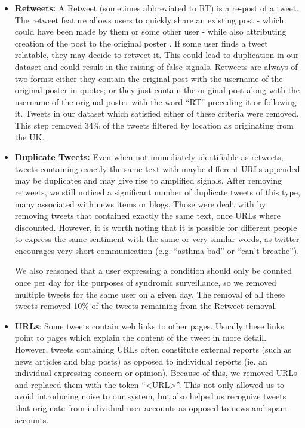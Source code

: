 \documentclass[10pt,letterpaper]{article}
\begin{document}
\begin{itemize}
  \item \textbf{Retweets:} A Retweet (sometimes abbreviated to RT) is a re-post of a tweet. The retweet feature allows users to quickly share an existing post - which could have been made by them or some other user - while also attributing creation of the post to the original poster \cite{REF10}. If some user finds a tweet relatable, they may decide to retweet it. This could lead to duplication in our dataset and could result in the raising of false signals. Retweets are always of two forms: either they contain the original post with the username of the original poster in quotes; or they just contain the original post along with the username of the original poster with the word ``RT'' preceding it or following it. Tweets in our dataset which satisfied either of these criteria were removed. This step removed 34\% of the tweets filtered by location as originating from the UK.
  
  \item \textbf{Duplicate Tweets:} Even when not immediately identifiable as retweets, tweets containing exactly the same text  with maybe different URLs appended may be duplicates and may give rise to amplified signals. After removing retweets, we still noticed a significant number of duplicate tweets of this type, many associated with news items or blogs. Those were dealt with by removing tweets that contained exactly the same text, once URLs where discounted. However, it is worth noting that it is possible for different people to express the same sentiment with the same  or very similar words, as twitter encourages very short communication (e.g.  ``asthma bad'' or  ``can't breathe''). 
  
We also reasoned that a user expressing a condition should only be counted once per day for the purposes of syndromic surveillance, so we removed multiple tweets for the same user on a given day. The removal of all these tweets removed 10\% of the tweets remaining from the Retweet removal.
  
  \item \textbf{URLs}: Some tweets contain web links to other pages. Usually these links point to pages which explain the content of the tweet in more detail. However, tweets containing URLs often constitute external reports (such as news articles and blog posts) as opposed to individual reports (ie. an individual expressing concern or opinion). Because of this, we removed URLs and replaced them with the token ``<URL>''. This not only allowed us to avoid introducing noise to our system, but also helped us recognize tweets that originate from individual user accounts as opposed to news and spam accounts.
    

\end{itemize}
\end{document}
